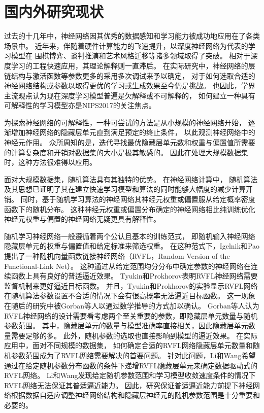 \section{国内外研究现状}\label{sec:2.3}

过去的十几年中，神经网络因其优秀的数据感知和学习能力被成功地应用在了各类场景中\cite{cybenko1992approximation,chen1995universal}。
近年来，伴随着硬件计算能力的飞速提升，以深度神经网络为代表的学习模型在
围棋博弈\cite{silver2017mastering}、谈判推演\cite{lewis2017deal}和艺术风格迁移\cite{he2016powerful}等诸多领域取得了突破。
相对于深度学习的工程快速应用，其理论解释则一直滞后。
在实际研究中，神经网络的层链结构与激活函数等参数更多的采用多次调试来予以确定，
对于如何选取合适的神经网络结构或参数以取得更优的学习或生成效果至今仍是挑战。
也因此，学界主流观点认为现在深度学习模型普遍是欠解释或不可解释的，
如何建立一种具有可解释性的学习模型亦是NIPS2017的关注焦点。

为探索神经网络的可解释性，一种可尝试的方法是从小规模的神经网络开始，
逐渐增加神经网络的隐藏层单元直到满足预定的终止条件，
以此观测神经网络中的神经元作用\cite{kwok1997objective}。
众所周知的是，迭代寻找最优隐藏层单元数和权重与偏置值所需要的计算复杂度和开销对数据集的大小是极其敏感的。
因此在处理大规模数据集时，这种方法很难得以应用。

面对大规模数据集，随机算法具有其独特的优势\cite{mahoney2011randomized}。
在神经网络计算中，
随机算法及其思想已证明了其在建立快速学习模型和算法的同时能够大幅度的减少计算开销\cite{scardapane2017randomness,cui2016high}。
同时，基于随机学习算法的神经网络其神经元权重或偏置服从给定概率密度函数下的随机分布。
这种神经元权重或偏置分布确定的神经网络相比纯训练优化神经元权重与偏置的神经网络无疑更具有解释性。

随机学习神经网络一般遵循着两个公认且基本的训练范式，
即随机输入神经网络隐藏层单元的权重与偏置值和给定标准来筛选权重。
在这种范式下，Igelnik和Pao提出了一种随机向量函数链接神经网络（RVFL，Random Version of the Functional-Link Net）\cite{pao1992functional}。
这种通过从给定范围均分分布中确定参数的神经网络在连续函数上具有良好的普适逼近效果。
Tyukin和Prokhorov表明RVFL神经网络需要监督机制来更好逼近目标函数\cite{tyukin2009feasibility}。
并且，Tyukin和Prokhorov的实验显示RVFL网络在随机算法参数设置不合适的情况下会有很高概率无法逼近目标函数。
这一现象在随后的研究中被Gorban等人以通过数学推导的方式加以确认\cite{gorban2016approximation}。
Gorban等人认为RVFL神经网络的设计需要看考虑两个至关重要的参数，即隐藏层单元数量与随机参数范围。
其中，隐藏层单元的数量与模型准确率直接相关，因此隐藏层单元数量需要足够的多。
此外，随机参数的选取也直接影响到模型的逼近效果。
在实际应用中，面对不同规模的数据集，
如何确定合适的RVFL网络隐藏层单元数量和随机参数范围成为了RVFL网络需要解决的首要问题。
针对此问题，Li和Wang希望通过在给定随机参数分布函数的条件下递增RVFL隐藏层单元来确定数据驱动式的RVFL网络\cite{li2017insights}。
Li和Wang发现给定随机参数范围和学习模型收敛速度条件的情况下RVFL网络无法保证其普适逼近能力。
因此，研究保证普适逼近能力前提下神经网络根据数据自适应调整神经网络结构和隐藏层神经元的随机参数范围是十分重要和必要的。
